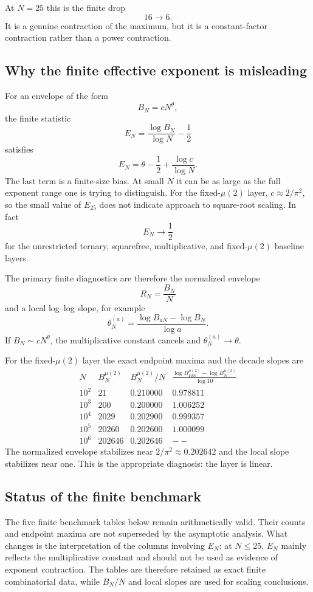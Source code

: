 \documentclass[11pt]{article}
\begin{document}
At $N=25$ this is the finite drop
\[
 16\longrightarrow6.
\]
It is a genuine contraction of the maximum, but it is a constant-factor contraction rather than a power contraction.

\subsection{Why the finite effective exponent is misleading}
For an envelope of the form
\[
 B_N=cN^\theta,
\]
the finite statistic
\[
 E_N=\frac{\log B_N}{\log N}-\frac12
\]
satisfies
\[
 \boxed{E_N=\theta-\frac12+\frac{\log c}{\log N}}.
\]
The last term is a finite-size bias. At small $N$ it can be as large as the full exponent range one is trying to distinguish. For the fixed-$\mu(2)$ layer, $c\approx2/\pi^2$, so the small value of $E_{25}$ does not indicate approach to square-root scaling. In fact
\[
 \boxed{E_N\longrightarrow\frac12}
\]
for the unrestricted ternary, squarefree, multiplicative, and fixed-$\mu(2)$ baseline layers.

The primary finite diagnostics are therefore the normalized envelope
\[
 \boxed{R_N=\frac{B_N}{N}}
\]
and a local log--log slope, for example
\[
 \boxed{
 \theta_N^{(a)}=
 \frac{\log B_{aN}-\log B_N}{\log a}
 }.
\]
If $B_N\sim cN^\theta$, the multiplicative constant cancels and $\theta_N^{(a)}\to\theta$.

For the fixed-$\mu(2)$ layer the exact endpoint maxima and the decade slopes are
\[
\begin{array}{c|r|c|c}
N&B_N^{\mu(2)}&B_N^{\mu(2)}/N&
\displaystyle\frac{\log B_{10N}^{\mu(2)}-\log B_N^{\mu(2)}}{\log 10}\\ \hline
10^2&21&0.210000&0.978811\\
10^3&200&0.200000&1.006252\\
10^4&2029&0.202900&0.999357\\
10^5&20260&0.202600&1.000099\\
10^6&202646&0.202646&--
\end{array}
\]
The normalized envelope stabilizes near $2/\pi^2\approx0.202642$ and the local slope stabilizes near one. This is the appropriate diagnosis: the layer is linear.

\subsection{Status of the finite benchmark}
The five finite benchmark tables below remain arithmetically valid. Their counts and endpoint maxima are not superseded by the asymptotic analysis. What changes is the interpretation of the columns involving $E_N$: at $N\le25$, $E_N$ mainly reflects the multiplicative constant and should not be used as evidence of exponent contraction. The tables are therefore retained as exact finite combinatorial data, while $B_N/N$ and local slopes are used for scaling conclusions.
\end{document}
